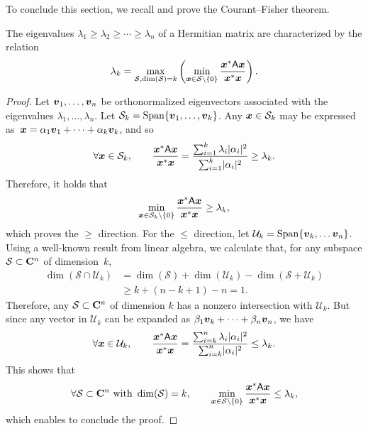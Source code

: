 To conclude this section,
we recall and prove the Courant--Fisher theorem.
\begin{theorem}
    \label{theorem:courant-fisher}
    The eigenvalues $\lambda_1 \geq \lambda_2 \geq \dotsb \geq \lambda_n$ of a Hermitian matrix are characterized by the relation
    \[
        \lambda_k = \max_{\mathcal S, {\rm dim}(\mathcal S) = k} \left( \min_{\mathbf{\boldsymbol{x}} \in \mathcal S \backslash\{0\}} \frac{\mathbf{\boldsymbol{x}}^* \mathsf A \mathbf{\boldsymbol{x}}}{\mathbf{\boldsymbol{x}}^* \mathbf{\boldsymbol{x}}} \right).
    \]
\end{theorem}
\begin{proof}
    Let $\mathbf{\boldsymbol{v}}_1, \dotsc, \mathbf{\boldsymbol{v}}_n$ be orthonormalized eigenvectors associated with the eigenvalues $\lambda_1, \dotsc, \lambda_n$.
    Let $\mathcal S_k = \operatorname{Span} \{ \mathbf{\boldsymbol{v}}_1, \dotsc, \mathbf{\boldsymbol{v}}_k \}$.
    Any $\mathbf{\boldsymbol{x}} \in \mathcal S_k$ may be expressed as~$\mathbf{\boldsymbol{x}} = \alpha_1 \mathbf{\boldsymbol{v}}_1 + \dotsb + \alpha_k \mathbf{\boldsymbol{v}}_k$,
    and so
    \[
        \forall \mathbf{\boldsymbol{x}} \in \mathcal S_k, \qquad
        \frac{\mathbf{\boldsymbol{x}}^* \mathsf A \mathbf{\boldsymbol{x}}}{\mathbf{\boldsymbol{x}}^* \mathbf{\boldsymbol{x}}} =
        \frac{\sum_{i=1}^{k} \lambda_i \lvert\alpha_i\rvert^2}{\sum_{i=1}^{k} \lvert\alpha_i\rvert^2}
        \geq \lambda_k.
    \]
    Therefore,
    it holds that
    \[
         \min_{\mathbf{\boldsymbol{x}} \in \mathcal S_k \backslash\{0\}} \frac{\mathbf{\boldsymbol{x}}^* \mathsf A \mathbf{\boldsymbol{x}}}{\mathbf{\boldsymbol{x}}^* \mathbf{\boldsymbol{x}}}  \geq \lambda_k,
    \]
    which proves the $\geq$ direction.
    For the $\leq$ direction,
    let $\mathcal U_k = \operatorname{Span} \{ \mathbf{\boldsymbol{v}}_{k}, \dots \mathbf{\boldsymbol{v}}_n \}$.
    Using a well-known result from linear algebra,
    we calculate that, for any subspace $\mathcal S \subset \mathbf C^n$ of dimension~$k$,
    \begin{align*}
        \dim(\mathcal S \cap \mathcal U_k)
        &= \dim(\mathcal S) + \dim(\mathcal U_k) -\dim(\mathcal S + \mathcal U_k) \\
        &\geq  k + (n - k + 1) - n = 1.
    \end{align*}
    Therefore, any $\mathcal S \subset \mathbf C^n$ of dimension $k$
    has a nonzero intersection with $\mathcal U_k$.
    But since any vector in $\mathcal U_k$ can be expanded as $\beta_1 \mathbf{\boldsymbol{v}}_k + \dotsb + \beta_n \mathbf{\boldsymbol{v}}_n$,
    we have
    \[
        \forall \mathbf{\boldsymbol{x}} \in \mathcal U_k, \qquad
        \frac{\mathbf{\boldsymbol{x}}^* \mathsf A \mathbf{\boldsymbol{x}}}{\mathbf{\boldsymbol{x}}^* \mathbf{\boldsymbol{x}}} =
        \frac{\sum_{i=k}^{n} \lambda_i \lvert\alpha_i\rvert^2}{\sum_{i=k}^{n} \lvert\alpha_i\rvert^2}
        \leq \lambda_k.
    \]
    This shows that
    \[
        \forall \mathcal S \subset \mathbf C^n \text{ with } \dim(\mathcal S) = k,
        \qquad
         \min_{\mathbf{\boldsymbol{x}} \in \mathcal S \backslash\{0\}} \frac{\mathbf{\boldsymbol{x}}^* \mathsf A \mathbf{\boldsymbol{x}}}{\mathbf{\boldsymbol{x}}^* \mathbf{\boldsymbol{x}}}  \leq \lambda_k,
    \]
    which enables to conclude the proof.
\end{proof}

